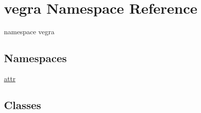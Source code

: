 \hypertarget{namespacevegra}{}\section{vegra Namespace Reference}
\label{namespacevegra}


namespace vegra  


\subsection*{Namespaces}
\begin{DoxyCompactItemize}
\item 
 \mbox{\hyperlink{namespacevegra_1_1attr}{attr}}
\end{DoxyCompactItemize}
\subsection*{Classes}
